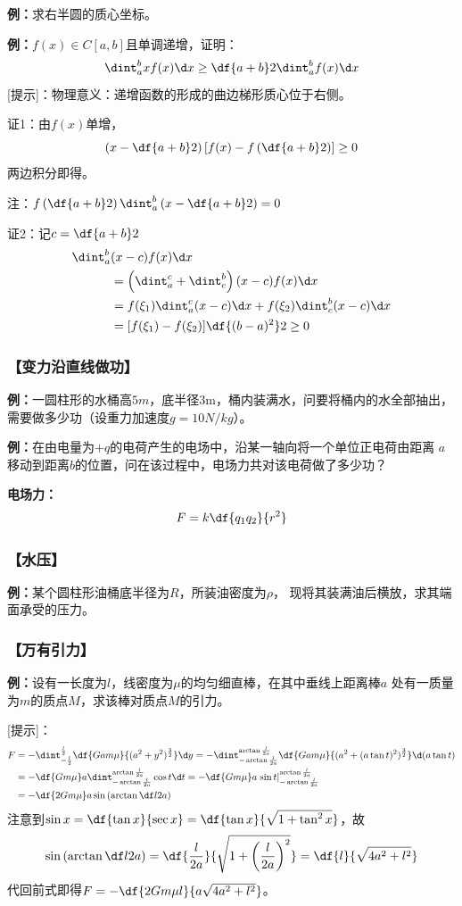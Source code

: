 {\bf 例：}求右半圆的质心坐标。

{\bf 例：}$f(x)\in C[a,b]$且单调递增，证明：
$$\dint_a^bxf(x)\d x\geq\df{a+b}2\dint_a^bf(x)\d x$$
[提示]：物理意义：递增函数的形成的曲边梯形质心位于右侧。

证1：由$f(x)$单增，
$$\left(x-\df{a+b}2\right)\left[f(x)-f\left(
\df{a+b}2\right)\right]\geq0$$
两边积分即得。

注：$f\left(\df{a+b}2\right)\dint_a^b\left(x-\df{a+b}2\right)=0$

证2：记$c=\df{a+b}2$
\begin{align}
	\dint_a^b&(x-c)f(x)\d x\notag\\
	&=\left(\dint_a^c+\dint_c^b\right)(x-c)f(x)\d x\notag\\
	&=f(\xi_1)\dint_a^c(x-c)\d x+f(\xi_2)\dint_c^b(x-c)\d x\notag\\
	&=[f(\xi_1)-f(\xi_2)]\df{(b-a)^2}2\geq0
\end{align}

\subsubsection{【变力沿直线做功】}

{\bf 例：}一圆柱形的水桶高$5m$，底半径$3$m，桶内装满水，问要将桶内的水全部抽出，
需要做多少功（设重力加速度$g=10N/kg$）。

{\bf 例：}在由电量为$+q$的电荷产生的电场中，沿某一轴向将一个单位正电荷由距离
$a$移动到距离$b$的位置，问在该过程中，电场力共对该电荷做了多少功？

{\bf 电场力：}
$$F=k\df{q_1q_2}{r^2}$$

\subsubsection{【水压】}

{\bf 例：}某个圆柱形油桶底半径为$R$，所装油密度为$\rho$，
现将其装满油后横放，求其端面承受的压力。

\subsubsection{【万有引力】}

{\bf 例：}设有一长度为$l$，线密度为$\mu$的均匀细直棒，在其中垂线上距离棒$a$
处有一质量为$m$的质点$M$，求该棒对质点$M$的引力。

[提示]：
\begin{align}
	F&=-\dint_{-\frac l2}^{\frac l2}\df{Gam\mu}{(a^2+y^2)^{\frac32}}\d y
	=-\dint_{-\arctan\frac l{2a}}^{\arctan\frac l{2a}}\df{Gam\mu}{(a^2+(a\tan
	t)^2)^{\frac32}}\d (a\tan t)\notag\\
	&=-\df{Gm\mu}a\dint_{-\arctan\frac l{2a}}^{\arctan\frac
	l{2a}}\cos t\d t=-\df{Gm\mu}a\left.\sin t\right|_{-\arctan\frac
	l{2a}}^{\arctan\frac l{2a}}\notag\\
	&=-\df{2Gm\mu}a\sin\left(\arctan\df l{2a}\right)\notag
\end{align}
注意到$\sin x=\df{\tan x}{\sec x}=\df{\tan x}{\sqrt{1+\tan^2 x}}$，故
$$\sin\left(\arctan\df l{2a}\right)=\df{\frac{l}{2a}}
{\sqrt{1+\left(\frac{l}{2a}\right)^2}}=\df{l}{\sqrt{4a^2+l^2}}$$
代回前式即得$F=-\df{2Gm\mu l}{a\sqrt{4a^2+l^2}}$。

